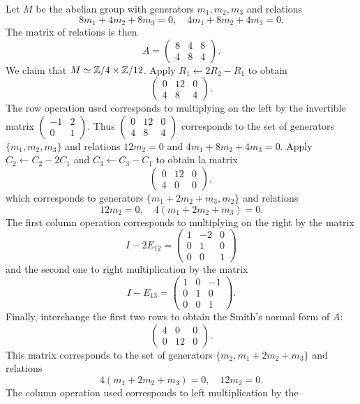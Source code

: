 \begin{example}
Let $M$ be the abelian group with generators $m_1,m_2,m_3$ and relations 
\[ 
8m_1+4m_2+8m_3=0, 
\quad 
4m_1+8m_2+4m_3=0.
\]
The matrix of relations is then 
\[
A=\begin{pmatrix}
8 & 4 & 8\\
4 & 8 & 4
\end{pmatrix}.
\]	
We claim that $M\simeq\mathbb{Z}/4\times\mathbb{Z}/{12}$. Apply 
$R_1\leftarrow 2R_2-R_1$ to obtain 
\[
\begin{pmatrix}
0 & 12 & 0\\
4 & 8 & 4	
\end{pmatrix}. 
\]
The row operation used corresponds to multiplying on the left by the 
invertible matrix $\begin{pmatrix}-1&2\\0&1\end{pmatrix}$. Thus 
$\begin{pmatrix}
0 & 12 & 0\\
4 & 8 & 4	
\end{pmatrix}$
corresponds to the set of generators 
$\{m_1,m_2,m_3\}$ and relations $12m_2=0$ and $4m_1+8m_2+4m_3=0$.
Apply $C_2\leftarrow C_2-2C_1$ and $C_3\leftarrow C_3-C_1$ to obtain 
la matrix
\[
\begin{pmatrix}
0 & 12 & 0\\
4 & 0 & 0	
\end{pmatrix},
\]
which corresponds to generators $\{m_1+2m_2+m_3,m_2\}$ 
and relations 
\[ 
12m_2=0,\quad 
4(m_1+2m_2+m_3)=0.
\]
The first column operation
corresponds to multiplying on the right by 
the matrix 
\[ 
I-2E_{12}=\begin{pmatrix}1&-2&0\\0&1&0\\0&0&1\end{pmatrix}
\]
and
the second one to right multiplication by the matrix
\[ 
I-E_{13}=\begin{pmatrix}1&0&-1\\0&1&0\\0&0&1\end{pmatrix}.
\]
Finally, interchange the first two rows to obtain
the Smith's normal form of $A$: 
\[
\begin{pmatrix}
4 & 0 & 0\\
0 & 12 & 0	
\end{pmatrix}.
\]
This matrix corresponds to 
the set of generators $\{m_2,m_1+2m_2+m_3\}$ and relations 
\[ 
4(m_1+2m_2+m_3)=0,\quad 
12m_2=0.
\]
The column operation used corresponds to left multiplication by the 

\end{example}
